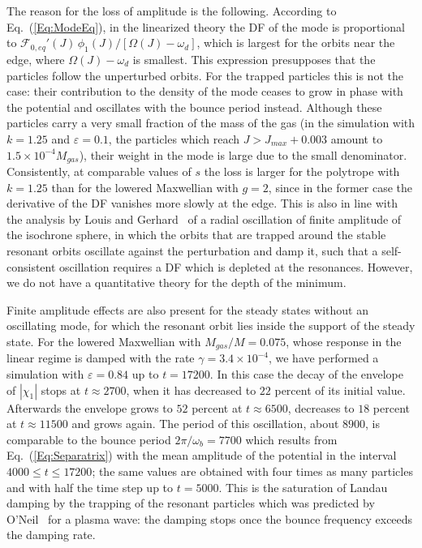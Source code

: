 The reason for the loss of amplitude is the following. According to Eq.~(\ref{Eq:ModeEq}), in the linearized theory the DF of the mode is proportional to $\mathcal{F}_{0,eq}'(J)\,\phi_1(J)/[\Omega(J) - \omega_d]$, which is largest for the orbits near the edge, where $\Omega(J) - \omega_d$ is smallest. This expression presupposes that the particles follow the unperturbed orbits. For the trapped particles this is not the case: their contribution to the density of the mode ceases to grow in phase with the potential and oscillates with the bounce period instead. Although these particles carry a very small fraction of the mass of the gas (in the simulation with $k = 1.25$ and $\varepsilon = 0.1$, the particles which reach $J > J_{max} + 0.003$ amount to $1.5\times 10^{-4} M_{gas}$), their weight in the mode is large due to the small denominator. Consistently, at comparable values of $s$ the loss is larger for the polytrope with $k = 1.25$ than for the lowered Maxwellian with $g = 2$, since in the former case the derivative of the DF vanishes more slowly at the edge. This is also in line with the analysis by Louis and Gerhard~\cite{pLoG88} of a radial oscillation of finite amplitude of the isochrone sphere, in which the orbits that are trapped around the stable resonant orbits oscillate against the perturbation and damp it, such that a self-consistent oscillation requires a DF which is depleted at the resonances. However, we do not have a quantitative theory for the depth of the minimum.

Finite amplitude effects are also present for the steady states without an oscillating mode, for which the resonant orbit lies inside the support of the steady state. For the lowered Maxwellian with $M_{gas}/M = 0.075$, whose response in the linear regime is damped with the rate $\gamma = 3.4\times 10^{-4}$, we have performed a simulation with $\varepsilon = 0.84$ up to $t = 17200$. In this case the decay of the envelope of $|\chi_1|$ stops at $t\approx 2700$, when it has decreased to $22$ percent of its initial value. Afterwards the envelope grows to $52$ percent at $t\approx 6500$, decreases to $18$ percent at $t\approx 11500$ and grows again. The period of this oscillation, about $8900$, is comparable to the bounce period $2\pi/\omega_b = 7700$ which results from Eq.~(\ref{Eq:Separatrix}) with the mean amplitude of the potential in the interval $4000\leq t\leq 17200$; the same values are obtained with four times as many particles and with half the time step up to $t = 5000$. This is the saturation of Landau damping by the trapping of the resonant particles which was predicted by O'Neil~\cite{tO65} for a plasma wave: the damping stops once the bounce frequency exceeds the damping rate.

